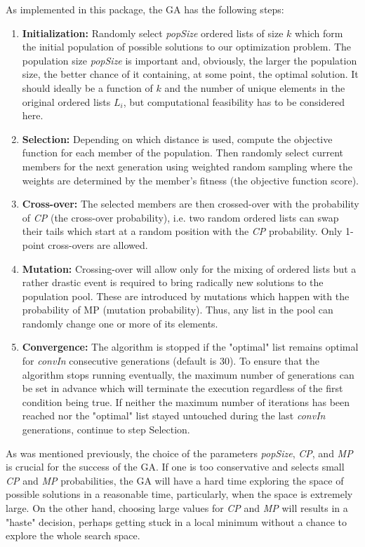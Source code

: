 \documentclass[11pt]{article}
\begin{document}
    As implemented in this package, the GA has the following steps:
 \begin{enumerate}
        \item{\textbf{Initialization:} Randomly select \emph{popSize} ordered lists of size $k$ which form the initial
        population of possible solutions to our optimization problem. The population size \emph{popSize} is important and, obviously,
        the larger the population size, the better chance of it containing, at some point, the optimal solution. It should ideally be
        a function of $k$ and the number of unique elements in the original ordered lists $L_i$, but computational feasibility has to be 
        considered here.}
        \item{\textbf{Selection:} Depending on which distance is used, compute the objective function for each member of the population.
        Then randomly select current members for the next generation using weighted
        random sampling where the weights are determined by the member's fitness (the objective function score).} 
        \item{\textbf{Cross-over:} The selected
        members are then crossed-over with the probability of \emph{CP} (the cross-over probability), i.e. two random ordered lists
        can swap their tails which start at a random position with the \emph{CP} probability. Only 1-point cross-overs are allowed.}       
        \item{\textbf{Mutation:} Crossing-over will allow only for the mixing of ordered lists but a rather
        drastic event is required to bring radically new solutions to the population pool. These are introduced by mutations which
        happen with the probability of MP (mutation probability). Thus, any list in the pool can randomly change one or
        more of its elements.}
        \item{\textbf{Convergence:} The algorithm is stopped if the "optimal" list remains optimal for \emph{convIn} consecutive
        generations (default is 30). To ensure that the algorithm stops running eventually, the maximum number of generations can
        be set in advance which will terminate the execution regardless of the first condition being true. If neither
        the maximum number of iterations has been reached nor the "optimal" list stayed untouched during the last
        \emph{convIn} generations, continue to step Selection.}
 \end{enumerate}
 
 As was mentioned previously, the choice of the parameters \emph{popSize}, \emph{CP}, and \emph{MP} is crucial for the success of the GA.
 If one is too conservative and selects small \emph{CP} and \emph{MP} probabilities, the GA will have a hard time exploring the 
 space of possible solutions in a reasonable time, particularly, when the space is extremely large. On the other hand,
 choosing large values for \emph{CP} and \emph{MP} will results in a "haste" decision, perhaps getting stuck in a local minimum
 without a chance to explore the whole search space. 
 
\end{document}
